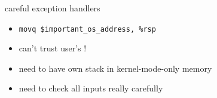 \begin{frame}[fragile,label=careful]{careful exception handlers}
\begin{itemize}
    \item \lstinline|movq $important_os_address, %rsp|
    \item can't trust user's !
    \vspace{.5cm}
    \item need to have own stack in kernel-mode-only memory 
    \item need to check all inputs really carefully
\end{itemize}
\end{frame}


